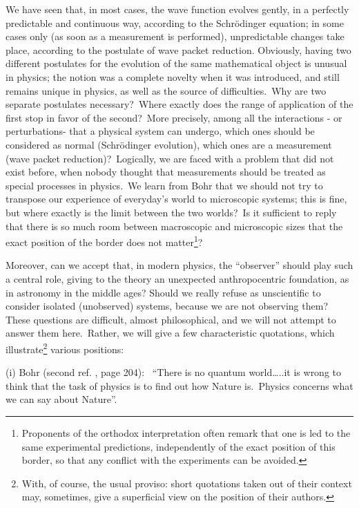 \documentclass[12pt,onecolumn]{article}%
\begin{document}
We have seen that, in most cases, the wave function evolves gently, in a
perfectly predictable and continuous way, according to the Schr\"{o}dinger
equation; in some cases only (as soon as a measurement is performed),
unpredictable changes take place, according to the postulate of wave packet
reduction. Obviously, having two different postulates for the evolution of the
same mathematical object is unusual in physics; the notion was a complete
novelty when it was introduced, and still remains unique in physics, as well
as the source of difficulties.\ Why are two separate postulates
necessary?\ Where exactly does the range of application of the first stop in
favor of the second?\ More precisely, among all the interactions - or
perturbations- that a physical system can undergo, which ones should be
considered as normal (Schr\"{o}dinger evolution), which ones are a measurement
(wave packet reduction)?\ Logically, we are faced with a problem that did not
exist before, when nobody thought that measurements should be treated as
special processes in physics.\ We learn from Bohr that we should not try to
transpose our experience of everyday's world to microscopic systems; this is
fine, but where exactly is the limit between the two worlds?\ Is it sufficient
to reply that there is so much room between macroscopic and microscopic sizes
that the exact position of the border does not matter\footnote{Proponents of
the orthodox interpretation often remark that one is led to the same
experimental predictions, independently of the exact position of this border,
so that any conflict with the experiments can be avoided.}?

Moreover, can we accept that, in modern physics, the ``observer'' should play
such a central role, giving to the theory an unexpected anthropocentric
foundation, as in astronomy in the middle ages? Should we really refuse as
unscientific to consider isolated (unobserved) systems, because we are not
observing them? These questions are difficult, almost philosophical, and we
will not attempt to answer them here.\ Rather, we will give a few
characteristic quotations, which illustrate\footnote{With, of course, the
usual proviso: short quotations taken out of their context may, sometimes,
give a superficial view on the position of their authors.} various positions:

(i) Bohr (second ref. \cite{Jammer}, page 204): \ ``There is no quantum
world\ldots ..it is wrong to think that the task of physics is to find out how
Nature is.\ Physics concerns what we can say about Nature''.
\end{document}
